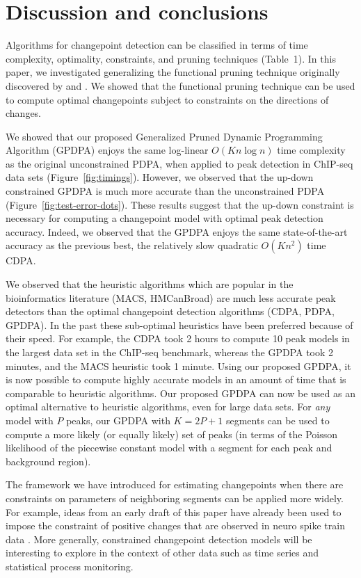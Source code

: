 \documentclass[twoside,11pt]{article}
\begin{document}
\section{Discussion and conclusions}
\label{sec:discussion}

Algorithms for changepoint detection can be classified in terms of
time complexity, optimality, constraints, and pruning techniques
(Table~1). In this paper, we investigated generalizing the functional
pruning technique originally discovered by \citet{pruned-dp} and
\citet{phd-johnson}. We showed that the functional pruning technique can
be used to compute optimal changepoints subject to constraints
on the directions of changes.

We showed that our proposed Generalized Pruned Dynamic Programming
Algorithm (GPDPA) enjoys the same log-linear $O(Kn\log n)$ time
complexity as the original unconstrained PDPA, when applied to peak
detection in ChIP-seq data sets (Figure~\ref{fig:timings}). However,
we observed that the up-down constrained GPDPA is much more accurate
than the unconstrained PDPA (Figure~\ref{fig:test-error-dots}). These
results suggest that the up-down constraint is necessary for computing
a changepoint model with optimal peak detection accuracy. Indeed, we
observed that the GPDPA enjoys the same state-of-the-art accuracy as
the previous best, the relatively slow quadratic $O(Kn^2)$ time
CDPA.

We observed that the heuristic algorithms which are popular in the
bioinformatics literature (MACS, HMCanBroad) are much less accurate peak detectors
than the optimal changepoint detection algorithms (CDPA, PDPA,
GPDPA). In the past these sub-optimal heuristics have been preferred
because of their speed. For example, the CDPA took 2 hours to compute
10 peak models in the largest data set in the ChIP-seq benchmark,
whereas the GPDPA took 2 minutes, and the MACS heuristic took 1
minute. Using our proposed GPDPA, it is now possible to compute highly
accurate models in an amount of time that is comparable to heuristic
algorithms. Our proposed GPDPA can now be used as an optimal
alternative to heuristic algorithms, even for large data sets. 
For \emph{any} model with $P$ peaks, our GPDPA with $K=2P+1$ segments can be used to compute 
a more likely (or equally likely) set of peaks (in terms of the Poisson likelihood 
of the piecewise constant model with a segment for each peak and background region).

The framework we have introduced for estimating changepoints when
there are constraints on parameters of neighboring segments can be
applied more widely. For example, ideas from an early draft of this
paper \citep{Hocking-constrained-changepoint-detection} have already
been used to impose the constraint of positive changes that are
observed in neuro spike train data \citep{Jewell2018}. More generally,
constrained changepoint detection models will be interesting to
explore in the context of other data such as time series and
statistical process monitoring.
 
\end{document}
